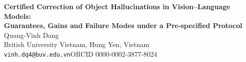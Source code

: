\documentclass[11pt,a4paper]{article}
\begin{document}
\begin{center}
{\Large\bfseries Certified Correction of Object Hallucinations in Vision--Language Models:\\
Guarantees, Gains and Failure Modes under a Pre-specified Protocol}\\[1.5em]
Quang-Vinh Dang\\
British University Vietnam, Hung Yen, Vietnam\\
\texttt{vinh.dq4@buv.edu.vn}\quad ORCID 0000-0002-3877-8024
\end{center}
\end{document}
